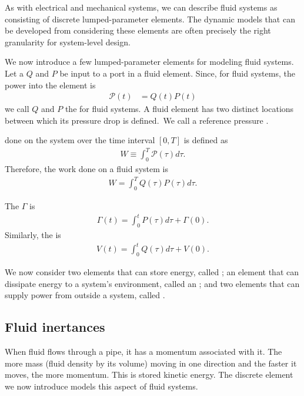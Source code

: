 \documentclass[dynamic_systems.tex]{subfiles}
\begin{document}
As with electrical and mechanical systems, we can describe fluid systems as consisting of discrete lumped-parameter elements.
The dynamic models that can be developed from considering these elements are often precisely the right granularity for system-level design.
\tags{}

We now introduce a few lumped-parameter elements for modeling fluid systems.
Let a  $Q$ and  $P$ be input to a port in a fluid element.
Since, for fluid systems, the power into the element is 
\begin{align}
	\mathcal{P}(t) &= Q(t) P(t)
\end{align}
we call $Q$ and $P$ the  for fluid systems.
A fluid element has two distinct locations between which its pressure drop is defined.\
We call a reference pressure .

 done on the system over the time interval $[0,T]$ is defined as
\begin{align}
	W \equiv \int_0^T \mathcal{P}(\tau) d\tau.
\end{align}
Therefore, the work done on a fluid system is 
\begin{align}
	W = \int_0^T Q(\tau) P(\tau) d\tau.
\end{align}

The  $\Gamma$ is
\begin{align}
	\Gamma(t) = \int_0^t P(\tau) d\tau + \Gamma(0).
\end{align}
Similarly, the  is
\begin{align}
	V(t) = \int_0^t Q(\tau) d\tau + V(0).
\end{align}

We now consider two elements that can store energy, called ; an element that can dissipate energy to a system's environment, called an ; and two elements that can supply power from outside a system, called .
\tags{S, D, A, T}

\subsection{Fluid inertances}

When fluid flows through a pipe, it has a momentum associated with it.
The more mass (fluid density by its volume) moving in one direction and the faster it moves, the more momentum.
This is stored kinetic energy.
The discrete element we now introduce models this aspect of fluid systems.
\tags{}
\end{document}

